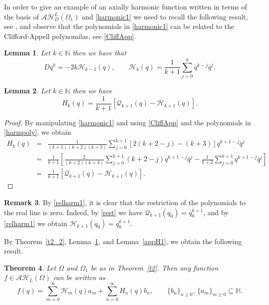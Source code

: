 \documentclass[reqno,11pt]{amsart}
\numberwithin{equation}{section}
\newtheorem{theorem}{Theorem}[section]
\newtheorem{lemma}[theorem]{Lemma}
\theoremstyle{definition}
\newtheorem{remark}[theorem]{{\bf Remark}}
\begin{document}
In order to give an example of an axially harmonic function written in terms of the basis of $ \mathcal{AH}_D^L(\Omega_1)$ and \eqref{harmonic1} we need to recall the following result, see \cite{B, CDS}, and observe that the polynomials in \eqref{harmonic1} can be related to the Clifford-Appell polynomilas, see \eqref{CliffApp}.

\begin{lemma}
\label{appH}
Let $k \in \mathbb{N}$ then we have that
\begin{equation}
\label{harmpoly}
D q^k=-2k \mathcal{H}_{k-1}(q), \qquad \mathcal{H}_k(q)=\frac{1}{k+1} \sum_{j=0}^{k} q^{k-j} \bar{q}^j.
\end{equation}
\end{lemma}

\begin{lemma}
Let $k \in \mathbb{N}$ then we have
\begin{equation}
\label{relharm1}
H_k(q)=\frac{1}{k+1} \left[ \mathcal{Q}_{k+1}(q)-\mathcal{H}_{k+1}(q)\right].
\end{equation}
\end{lemma}
\begin{proof}
By manipulating \eqref{harmonic1} and using \eqref{CliffApp} and the polynomials in \eqref{harmpoly}, we obtain
\begin{eqnarray*}
H_k(q)
&=& \frac{1}{(k+1)(k+2)(k+3)} \sum_{j=0}^{k+1} [2(k+2-j)-(k+3)]q^{k+1-j} \bar{q}^j\\
&=& \frac{1}{k+1} \left[\frac{2}{(k+2)(k+3)} \sum_{j=0}^{k+1} (k+2-j) q^{k+1-j} \bar{q}^j-\frac{1}{k+2} \sum_{j=0}^{k+1} q^{k+1-j} \bar{q}^j \right]\\
&=&\frac{1}{k+1} \left[ \mathcal{Q}_{k+1}(q)-\mathcal{H}_{k+1}(q)\right].
\end{eqnarray*}
\end{proof}
\begin{remark}
By \eqref{relharm1}, it is clear that the restriction of the polynomials to the real line is zero. Indeed, by \eqref{rest} we have $\mathcal{Q}_{k+1}(q_0)=q_0^{k+1}$, and by \eqref{relharm1} we obtain $\mathcal{H}_{k+1}(q_0)=q_0^{k+1}$.
\end{remark}

By Theorem~\ref{t2_2}, Lemma~\ref{appH}, and Lemma~\ref{appH1}, we obtain the following result.

\begin{theorem}
	Let $\Omega$ and $\Omega_1$ be as in Theorem~\ref{t2}. Then any function $f \in \mathcal{AH}_L(\Omega)$ can be written as
	$$
	f(q)= \sum_{m=0}^\infty \mathcal{H}_m(q)a_m+\sum_{n=0}^{\infty} H_n(q)b_n, \qquad  \{b_n\}_{n \geq 0}, \, \{a_m\}_{m \geq 0} \subseteq \mathbb{H}.
	$$
\end{theorem}
\end{document}

